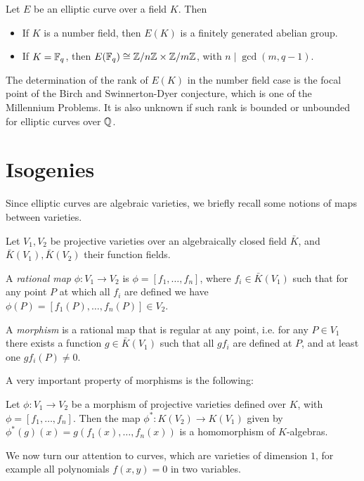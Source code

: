 \begin{theorem}
    Let $E$ be an elliptic curve over a field $K$. Then
    \begin{itemize}
        \item If $K$ is a number field, then $E(K)$ is a finitely generated abelian group.
        \item If $K=\mathbb{F}_q$, then $E(\mathbb{F}_q)\cong\mathbb{Z}/n\mathbb{Z}\times\mathbb{Z}/m\mathbb{Z}$, with $n\mid\gcd(m, q-1)$.
    \end{itemize}
\end{theorem}

The determination of the rank of $E(K)$ in the number field case is the focal point of the Birch and Swinnerton-Dyer conjecture, which is one of the Millennium Problems. It is also unknown if such rank is bounded or unbounded for elliptic curves over $\mathbb{Q}$.

\section{Isogenies}

Since elliptic curves are algebraic varieties, we briefly recall some notions of maps between varieties.

\begin{definition}
    Let $V_1,V_2$ be projective varieties over an algebraically closed field $\bar K$, and $\bar K(V_1), \bar K(V_2)$ their function fields.
    
    A \emph{rational map} $\phi:V_1\to V_2$ is $\phi=[f_1,\dots,f_n]$, where $f_i\in\bar K(V_1)$ such that for any point $P$ at which all $f_i$ are defined we have $\phi(P)=[f_1(P),\dots,f_n(P)]\in V_2$.
    
    A \emph{morphism} is a rational map that is regular at any point, i.e. for any $P\in V_1$ there exists a function $g\in\bar K(V_1)$ such that all $gf_i$ are defined at $P$, and at least one $gf_i(P)\neq0$.
\end{definition}

A very important property of morphisms is the following:
\begin{proposition}
    Let $\phi: V_1\to V_2$ be a morphism of projective varieties defined over $K$, with $\phi=[f_1,\dots,f_n]$. Then the map $\phi^\ast:K(V_2)\to K(V_1)$ given by $\phi^\ast(g)(x)=g(f_1(x),\dots,f_n(x))$ is a homomorphism of $K$-algebras.
\end{proposition}

We now turn our attention to curves, which are varieties of dimension $1$, for example all polynomials $f(x,y)=0$ in two variables.

